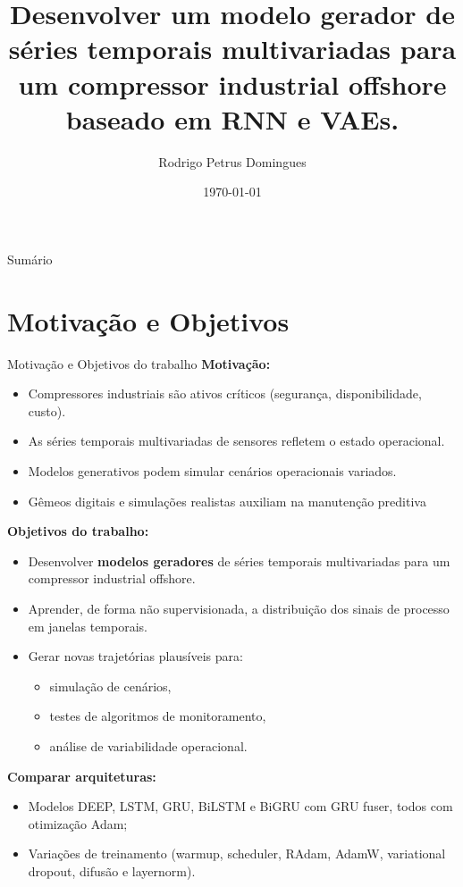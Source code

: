 \documentclass[10pt,aspectratio=169]{beamer}
\title[Modo gerador]{Desenvolver um modelo gerador de séries temporais multivariadas
          para um compressor industrial offshore baseado em RNN e VAEs.}
\author{Rodrigo Petrus Domingues}
\institute{CPE727 -- Deep Learning}
\date{\today}
\begin{document}
\begin{frame}
  \titlepage
\end{frame}

\begin{frame}{Sumário}
  \tableofcontents
\end{frame}

\section{Motivação e Objetivos}

\begin{frame}{Motivação e Objetivos do trabalho}
\noindent \textbf{Motivação:}
    \begin{itemize}
      \item Compressores industriais são ativos críticos (segurança, disponibilidade, custo).
      \item As séries temporais multivariadas de sensores refletem o estado operacional.
      \item Modelos generativos podem simular cenários operacionais variados.
      \item Gêmeos digitais e simulações realistas auxiliam na manutenção preditiva
    \end{itemize}

\noindent \textbf{Objetivos do trabalho:}

  \begin{itemize}
    \item Desenvolver \textbf{modelos geradores} de séries temporais multivariadas
          para um compressor industrial offshore.
    \item Aprender, de forma não supervisionada, a distribuição dos sinais de processo
          em janelas temporais.
    \item Gerar novas trajetórias plausíveis para:
      \begin{itemize}
        \item simulação de cenários,
        \item testes de algoritmos de monitoramento,
        \item análise de variabilidade operacional.
      \end{itemize}
     \end{itemize}
   \noindent \textbf{Comparar arquiteturas:}
        \begin{itemize}
          \item Modelos DEEP, LSTM, GRU, BiLSTM e BiGRU com GRU fuser, todos com otimização Adam;
          \item Variações de treinamento (warmup, scheduler, RAdam, AdamW, variational dropout, difusão e layernorm).
        \end{itemize}


\end{frame}
\end{document}
